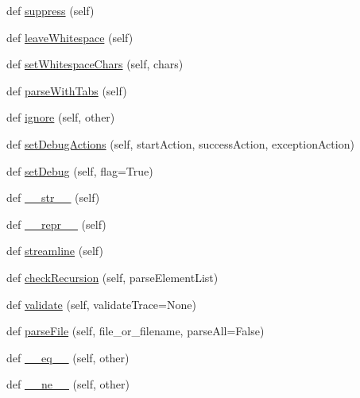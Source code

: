 \begin{DoxyCompactItemize}
def \hyperlink{classpip_1_1__vendor_1_1pyparsing_1_1ParserElement_a21c33a9acf5658c6f477c3c603348f14}{suppress} (self)
\item 
def \hyperlink{classpip_1_1__vendor_1_1pyparsing_1_1ParserElement_a5506c999238c1eecc7ac47af6cd699cb}{leave\+Whitespace} (self)
\item 
def \hyperlink{classpip_1_1__vendor_1_1pyparsing_1_1ParserElement_a1bc77f728d2c1e6e46851407fed3ebe1}{set\+Whitespace\+Chars} (self, chars)
\item 
def \hyperlink{classpip_1_1__vendor_1_1pyparsing_1_1ParserElement_ad8d9e9e959504a2e35207558d82ffb8e}{parse\+With\+Tabs} (self)
\item 
def \hyperlink{classpip_1_1__vendor_1_1pyparsing_1_1ParserElement_ade9a209a0e02b223cb330dd33b1618a8}{ignore} (self, other)
\item 
def \hyperlink{classpip_1_1__vendor_1_1pyparsing_1_1ParserElement_aa5dc02dc9dd7f139a0400723da8947c1}{set\+Debug\+Actions} (self, start\+Action, success\+Action, exception\+Action)
\item 
def \hyperlink{classpip_1_1__vendor_1_1pyparsing_1_1ParserElement_aa57485868018a5815428aca6c4e526b9}{set\+Debug} (self, flag=True)
\item 
def \hyperlink{classpip_1_1__vendor_1_1pyparsing_1_1ParserElement_ac354296be801fd7f7e3eaa50eb742082}{\+\_\+\+\_\+str\+\_\+\+\_\+} (self)
\item 
def \hyperlink{classpip_1_1__vendor_1_1pyparsing_1_1ParserElement_a3f9f6aff375b2b382de45ff1edc9b919}{\+\_\+\+\_\+repr\+\_\+\+\_\+} (self)
\item 
def \hyperlink{classpip_1_1__vendor_1_1pyparsing_1_1ParserElement_a976b8a0a7a90121bc3969dd280dab3d0}{streamline} (self)
\item 
def \hyperlink{classpip_1_1__vendor_1_1pyparsing_1_1ParserElement_a947fc3c1ebb2836f2050867d0189c8fc}{check\+Recursion} (self, parse\+Element\+List)
\item 
def \hyperlink{classpip_1_1__vendor_1_1pyparsing_1_1ParserElement_a1d25d80ae58b896335bcc7ff23c71524}{validate} (self, validate\+Trace=None)
\item 
def \hyperlink{classpip_1_1__vendor_1_1pyparsing_1_1ParserElement_a11cd70d97a3da22fdeafb84aa5ac7628}{parse\+File} (self, file\+\_\+or\+\_\+filename, parse\+All=False)
\item 
def \hyperlink{classpip_1_1__vendor_1_1pyparsing_1_1ParserElement_aabf2e6921a834539711aa145b69ab91b}{\+\_\+\+\_\+eq\+\_\+\+\_\+} (self, other)
\item 
def \hyperlink{classpip_1_1__vendor_1_1pyparsing_1_1ParserElement_a87fa6a51d15e072f3cc3195de82456d8}{\+\_\+\+\_\+ne\+\_\+\+\_\+} (self, other)

\end{DoxyCompactItemize}
